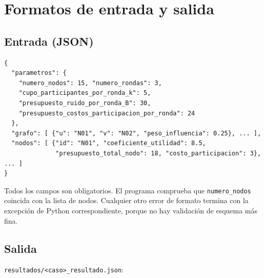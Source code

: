 \documentclass[11pt,a4paper]{article}
\begin{document}
\section{Formatos de entrada y salida}

\subsection{Entrada (JSON)}

\begin{lstlisting}
{
  "parametros": {
    "numero_nodos": 15, "numero_rondas": 3,
    "cupo_participantes_por_ronda_k": 5,
    "presupuesto_ruido_por_ronda_B": 30,
    "presupuesto_costos_participacion_por_ronda": 24
  },
  "grafo": [ {"u": "N01", "v": "N02", "peso_influencia": 0.25}, ... ],
  "nodos": [ {"id": "N01", "coeficiente_utilidad": 8.5,
              "presupuesto_total_nodo": 18, "costo_participacion": 3}, ... ]
}
\end{lstlisting}

Todos los campos son obligatorios. El programa comprueba que
\texttt{numero\_nodos} coincida con la lista de nodos. Cualquier otro error de
formato termina con la excepción de Python correspondiente, porque no hay
validación de esquema más fina.

\subsection{Salida}

\texttt{resultados/<caso>\_resultado.json}:
\end{document}
